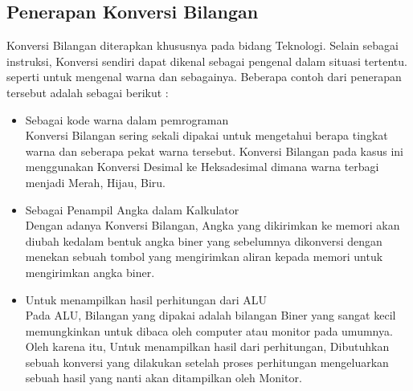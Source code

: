 \subsection{Penerapan Konversi Bilangan}
Konversi Bilangan diterapkan khususnya pada bidang Teknologi. Selain sebagai instruksi, Konversi sendiri dapat dikenal sebagai pengenal dalam situasi tertentu. seperti untuk mengenal warna dan sebagainya. Beberapa contoh dari penerapan tersebut adalah sebagai berikut : 
\begin{itemize}
\item Sebagai kode warna dalam pemrograman \\ Konversi Bilangan sering sekali dipakai untuk mengetahui berapa tingkat warna dan seberapa pekat warna tersebut. Konversi Bilangan pada kasus ini menggunakan Konversi Desimal ke Heksadesimal dimana warna terbagi menjadi Merah, Hijau, Biru. 
\item Sebagai Penampil Angka dalam Kalkulator \\ Dengan adanya Konversi Bilangan, Angka yang dikirimkan ke memori akan diubah kedalam bentuk angka biner yang sebelumnya dikonversi dengan menekan sebuah tombol yang mengirimkan aliran kepada memori untuk mengirimkan angka biner.
\item Untuk menampilkan hasil perhitungan dari ALU \\ Pada ALU, Bilangan yang dipakai adalah bilangan Biner yang sangat kecil memungkinkan untuk dibaca oleh computer atau monitor pada umumnya. Oleh karena itu, Untuk menampilkan hasil dari perhitungan, Dibutuhkan sebuah konversi yang dilakukan setelah proses perhitungan mengeluarkan sebuah hasil yang nanti akan ditampilkan oleh Monitor.
\end{itemize}

